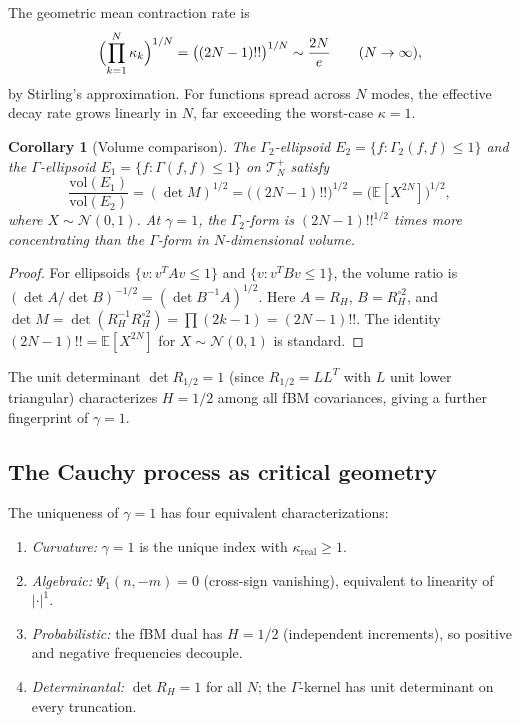 \documentclass[11pt,a4paper]{article}
\theoremstyle{plain}
\newtheorem{corollary}[theorem]{Corollary}
\theoremstyle{definition}
\theoremstyle{remark}
\newcommand{\E}{\mathbb{E}}
\begin{document}
The geometric mean contraction rate is
\[
  \Bigl(\prod_{k=1}^N \kappa_k\Bigr)^{1/N}
  = \bigl((2N-1)!!\bigr)^{1/N} \sim \frac{2N}{e}
  \qquad (N \to \infty),
\]
by Stirling's approximation.
For functions spread across $N$ modes, the effective decay rate
grows linearly in $N$, far exceeding the worst-case $\kappa = 1$.

\begin{corollary}[Volume comparison]\label{cor:volume}
The $\Gamma_2$-ellipsoid
$E_2 = \{f : \Gamma_2(f,f) \leq 1\}$ and the $\Gamma$-ellipsoid
$E_1 = \{f : \Gamma(f,f) \leq 1\}$ on $\mathcal{T}_N^+$ satisfy
\begin{equation}\label{eq:volume-ratio}
  \frac{\mathrm{vol}(E_1)}{\mathrm{vol}(E_2)}
  = (\det M)^{1/2} = \bigl((2N-1)!!\bigr)^{1/2}
  = \bigl(\E[X^{2N}]\bigr)^{1/2},
\end{equation}
where $X \sim \mathcal{N}(0,1)$.
At $\gamma = 1$, the $\Gamma_2$-form is $(2N-1)!!^{1/2}$ times
more concentrating than the $\Gamma$-form in $N$-dimensional volume.
\end{corollary}

\begin{proof}
For ellipsoids $\{v : v^T A v \leq 1\}$ and $\{v : v^T B v \leq 1\}$,
the volume ratio is $(\det A / \det B)^{-1/2} = (\det B^{-1}A)^{1/2}$.
Here $A = R_H$, $B = R_H^{\circ 2}$, and $\det M = \det(R_H^{-1}R_H^{\circ 2})
= \prod(2k-1) = (2N-1)!!$.
The identity $(2N-1)!! = \E[X^{2N}]$ for $X \sim \mathcal{N}(0,1)$
is standard.
\end{proof}

The unit determinant $\det R_{1/2} = 1$ (since $R_{1/2} = LL^T$
with $L$ unit lower triangular) characterizes $H = 1/2$ among
all fBM covariances, giving a further fingerprint of $\gamma = 1$.


\subsection{The Cauchy process as critical geometry}

The uniqueness of $\gamma = 1$ has four equivalent characterizations:
\begin{enumerate}[label=(\alph*)]
\item \emph{Curvature:} $\gamma = 1$ is the unique index with
  $\kappa_{\mathrm{real}} \geq 1$.
\item \emph{Algebraic:} $\Psi_1(n,-m) = 0$ (cross-sign vanishing),
  equivalent to linearity of $|\cdot|^1$.
\item \emph{Probabilistic:} the fBM dual has $H = 1/2$ (independent
  increments), so positive and negative frequencies decouple.
\item \emph{Determinantal:} $\det R_H = 1$ for all $N$; the
  $\Gamma$-kernel has unit determinant on every truncation.
\end{enumerate}
\end{document}
